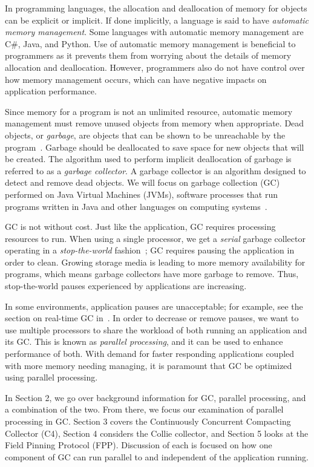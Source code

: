 \documentclass{sig-alternate}
\begin{document}
In programming languages, the allocation and deallocation
of memory for objects can be explicit or implicit. If done implicitly,
a language is said to have \emph{automatic memory management}. Some languages 
with automatic memory management are C\#, Java, and Python.
Use of automatic memory management is beneficial to programmers as it 
prevents them from worrying about the details of memory allocation and deallocation. 
However, programmers also do not have control over how memory management occurs,
which can have negative impacts on application performance.

Since memory for a program is not an unlimited resource, automatic memory management
must remove unused objects from memory when appropriate.
Dead objects, or \emph{garbage}, are objects that can be shown
to be unreachable by the program~\cite{glossary:g}. Garbage should be deallocated to 
save space for new objects that will be created. The algorithm used to perform implicit
deallocation of garbage is referred to as a \emph{garbage collector}.
A garbage collector is an algorithm designed to detect
and remove dead objects. We will focus on
garbage collection (GC) performed on Java Virtual Machines 
(JVMs), software processes that run programs written in Java and other languages 
on computing systems~\cite{Lindblom:2011}.

GC is not without cost.
Just like the application, GC requires processing resources to run. When using a single processor, 
we get a \emph{serial} garbage collector operating in a 
\emph{stop-the-world} fashion~\cite{Lindblom:2011}; GC requires
pausing the application in order to clean. 
Growing storage media is leading to more memory
availability for programs, which means garbage collectors
have more garbage to remove. Thus, stop-the-world pauses
experienced by applications are increasing.

In some environments,
application pauses are unacceptable; for example, see the section on 
real-time GC in~\cite{Lindblom:2011}. In order to decrease or remove 
pauses, we want to use multiple
processors to share the workload of both running an application and its GC.
This is known as \emph{parallel processing}, and it can be used
to enhance performance of both. With
demand for faster responding applications coupled with more memory needing managing,
it is paramount that GC be optimized using parallel processing. 

In Section 2, we go over background information for GC, parallel processing,
and a combination of the two.
From there, we focus our examination of parallel processing in GC.
Section 3 covers the Continuously Concurrent Compacting Collector (C4), Section
4 considers the Collie collector, and Section 5 looks at the Field Pinning Protocol (FPP).
Discussion of each is focused on how one component of GC can run parallel to
and independent of the application running. 
\end{document}
